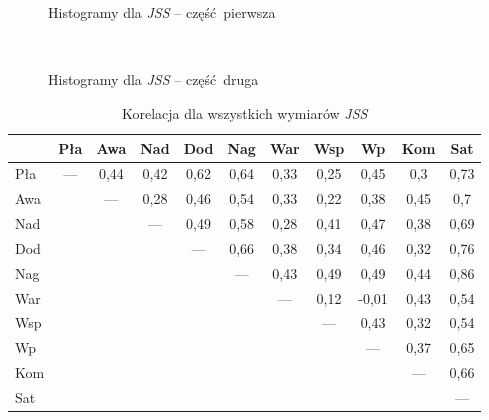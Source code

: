 \begin{figure}[h]
    \centering
    \\
    \\
    \caption{Histogramy dla \emph{JSS} -- część pierwsza}
\end{figure}

\begin{figure}[h]
    \centering
    \\
    \caption{Histogramy dla \emph{JSS} -- część druga}
\end{figure}

\begin{table}[h!]
\begin{center}
\begin{tabular} { l || c c c c c c c c c | c }
 & Pła & Awa & Nad & Dod & Nag & War & Wsp & Wp & Kom & Sat \\ \hline \hline
Pła & --- & 0,44 & 0,42 & 0,62 & 0,64 & 0,33 & 0,25 & 0,45 & 0,3 & 0,73 \\
Awa & & --- & 0,28 & 0,46 & 0,54 & 0,33 & 0,22 & 0,38 & 0,45 & 0,7 \\
Nad & & & --- & 0,49 & 0,58 & 0,28 & 0,41 & 0,47 & 0,38 & 0,69 \\
Dod & & & & --- & 0,66 & 0,38 & 0,34 & 0,46 & 0,32 & 0,76 \\
Nag & & & & & --- & 0,43 & 0,49 & 0,49 & 0,44 & 0,86 \\
War & & & & & & --- & 0,12 & -0,01 & 0,43 & 0,54 \\
Wsp & & & & & & & --- & 0,43 & 0,32 & 0,54 \\
Wp & & & & & & & & --- & 0,37 & 0,65 \\
Kom & & & & & & & & & --- & 0,66 \\ \hline
Sat & & & & & & & & & & --- \\ 
\end{tabular}
\end{center}
\label{tab:jss-correl}
\caption{Korelacja dla wszystkich wymiarów \emph{JSS}}
\end{table}

